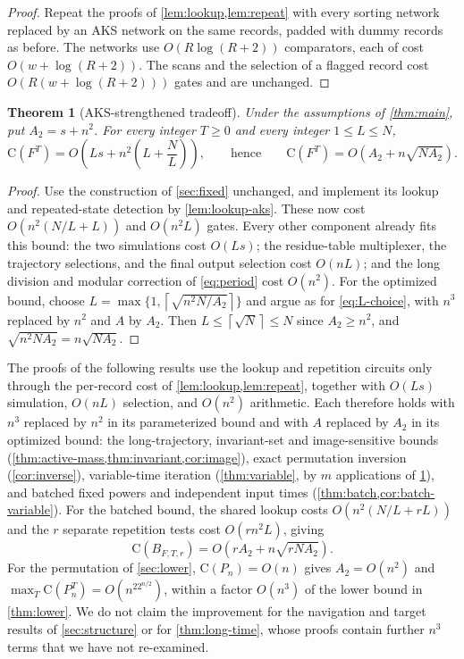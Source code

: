 \documentclass[11pt]{article}
\newtheorem{theorem}{Theorem}[section]
\theoremstyle{definition}
\theoremstyle{remark}
\newcommand{\CC}{\mathrm{C}}
\newcommand{\ceil}[1]{\left\lceil #1\right\rceil}
\numberwithin{equation}{section}
\begin{document}
\begin{proof}
Repeat the proofs of \cref{lem:lookup,lem:repeat} with every sorting
network replaced by an AKS network on the same records, padded with
dummy records as before.  The networks use $O(R\log(R+2))$ comparators,
each of cost $O(w+\log(R+2))$.  The scans and the selection of a
flagged record cost $O(R(w+\log(R+2)))$ gates and are unchanged.
\end{proof}

\begin{theorem}[AKS-strengthened tradeoff]\label{thm:aks}
Under the assumptions of \cref{thm:main}, put $A_2=s+n^2$.  For every
integer $T\geq0$ and every integer $1\leq L\leq N$,
\[
  \CC(F^T)=O\!\left(Ls+n^2\left(L+\frac NL\right)\right),
  \qquad\text{hence}\qquad
  \CC(F^T)=O\!\left(A_2+n\sqrt{NA_2}\right).
\]
\end{theorem}

\begin{proof}
Use the construction of \cref{sec:fixed} unchanged, and implement its
lookup and repeated-state detection by \cref{lem:lookup-aks}.  These now
cost $O(n^2(N/L+L))$ and $O(n^2L)$ gates.  Every other component already
fits this bound: the two simulations cost $O(Ls)$; the residue-table
multiplexer, the trajectory selections, and the final output selection
cost $O(nL)$; and the long division and modular correction of
\cref{eq:period} cost $O(n^2)$.  For the optimized bound, choose
$L=\max\{1,\ceil{\sqrt{n^2N/A_2}}\}$ and argue as for
\cref{eq:L-choice}, with $n^3$ replaced by $n^2$ and $A$ by $A_2$.
Then $L\leq\ceil{\sqrt N}\leq N$ since $A_2\geq n^2$, and
$\sqrt{n^2NA_2}=n\sqrt{NA_2}$.
\end{proof}

The proofs of the following results use the lookup and repetition
circuits only through the per-record cost of \cref{lem:lookup,lem:repeat},
together with $O(Ls)$ simulation, $O(nL)$ selection, and $O(n^2)$
arithmetic.  Each therefore holds with $n^3$ replaced by $n^2$ in its
parameterized bound and with $A$ replaced by $A_2$ in its optimized bound:
the long-trajectory, invariant-set and image-sensitive bounds
(\cref{thm:active-mass,thm:invariant,cor:image}), exact permutation
inversion (\cref{cor:inverse}), variable-time iteration
(\cref{thm:variable}, by $m$ applications of \cref{thm:aks}), and batched
fixed powers and independent input times
(\cref{thm:batch,cor:batch-variable}).  For the batched bound, the shared
lookup costs $O(n^2(N/L+rL))$ and the $r$ separate repetition tests cost
$O(rn^2L)$, giving
\[
  \CC(B_{F,T,r})=O\!\left(rA_2+n\sqrt{rNA_2}\right).
\]
For the permutation of \cref{sec:lower}, $\CC(P_n)=O(n)$ gives $A_2=O(n^2)$
and $\max_T\CC(P_n^T)=O(n^22^{n/2})$, within a factor $O(n^3)$ of the
lower bound in \cref{thm:lower}.  We do not claim the improvement for the
navigation and target results of \cref{sec:structure} or for
\cref{thm:long-time}, whose proofs contain further $n^3$ terms that we
have not re-examined.
\end{document}
